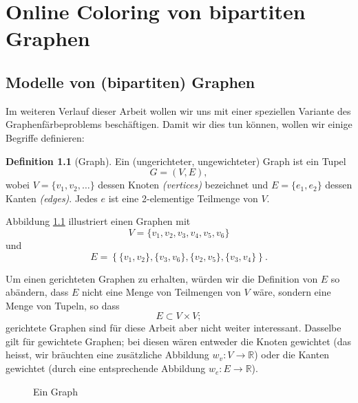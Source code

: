 \documentclass[11pt]{scrreprt} %
\theoremstyle{definition}
\newtheorem{definition}{Definition}
\begin{document}
\chapter{Online Coloring von bipartiten Graphen}

\section{Modelle von (bipartiten) Graphen}

Im weiteren Verlauf dieser Arbeit wollen wir uns mit einer speziellen Variante des Graphenfärbeproblems beschäftigen. Damit wir dies tun können, wollen wir einige Begriffe definieren:

\begin{definition}[Graph]

Ein (ungerichteter, ungewichteter) Graph ist ein Tupel
\[
	G = (V, E),
\]
wobei $V = \{v_1, v_2, \dots \}$ dessen Knoten {\sl (vertices)} bezeichnet und $E = \{ e_1, e_2 \}$ dessen Kanten {\sl (edges)}. Jedes $e$ ist eine 2-elementige Teilmenge von $V$. \cite{biggs}

\end{definition}

Abbildung \ref{graph} illustriert einen Graphen mit
\[
	V = \{v_1,v_2,v_3,v_4,v_5,v_6\}
\]
und
\[
	E = \left\{  \{v_1,v_2\}, \{v_3,v_6\}, \{v_2,v_5\}, \{v_3,v_4\}  \right\}.
\]

\bigskip
Um einen gerichteten Graphen zu erhalten, würden wir die Definition von $E$ so abändern, dass $E$ nicht eine Menge von Teilmengen von $V$ wäre, sondern eine Menge von Tupeln, so dass
\[
E \subset V \times V;
\]
gerichtete Graphen sind für diese Arbeit aber nicht weiter interessant. Dasselbe gilt für gewichtete Graphen; bei diesen wären entweder die Knoten gewichtet (das heisst, wir bräuchten eine zusätzliche Abbildung $w_v : V \rightarrow \mathbb{R}$) oder die Kanten gewichtet (durch eine entsprechende Abbildung $w_e : E \rightarrow \mathbb{R}$).

\begin{figure}
\caption{Ein Graph}
\label{graph}
\begin{center}


\end{center}
\end{figure}
\end{document}
